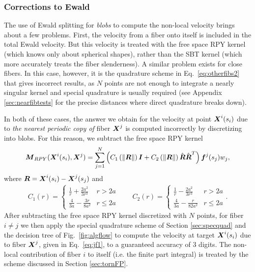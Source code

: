 \subsubsection{Corrections to Ewald}
The use of Ewald splitting for \textit{blobs} to compute the non-local velocity brings about a few problems. First, the velocity from a fiber onto itself is included in the total Ewald velocity. But this velocity is treated with the free space RPY kernel (which knows only about spherical shapes), rather than the SBT kernel (which more accurately treats the fiber slenderness). A similar problem exists for close fibers. In this case, however, it is the quadrature scheme in Eq.\ \eqref{eq:otherfibs2} that gives incorrect results, as $N$ points are not enough to integrate a nearly singular kernel and special quadrature is usually required (see Appendix \ref{sec:nearfibtests} for the precise distances where direct quadrature breaks down).  

In both of these cases, the answer we obtain for the velocity at point $\boldsymbol{X}^i(s_i)$ due to \textit{the nearest periodic copy of} fiber $\boldsymbol{X}^j$ is computed incorrectly by discretizing into blobs. For this reason, we subtract the free space RPY kernel \cite{rpyOG}
\begin{gather}
\label{eq:RPY}
\boldsymbol{M}_{RPY}(\boldsymbol{X}^i(s_i), \boldsymbol{X}^j) = \sum_{j=1}^N \left(C_1\left(\left\Vert \boldsymbol{R}\right\Vert\right)\boldsymbol{I}+C_2\left(\left\Vert \boldsymbol{R}\right\Vert\right)\hat{\boldsymbol{R}}\hat{\boldsymbol{R}}^T\right) \boldsymbol{f}^j(s_j) w_j,
\end{gather}
where $\boldsymbol{R}=\boldsymbol{X}^i(s_i)-\boldsymbol{X}^j(s_j)$ and
\begin{gather}
C_1(r) = \begin{cases} \frac{1}{r}+\frac{2a^2}{3r^3} & r > 2a\\[2 pt] \frac{4}{3a}-\frac{3r}{8a^2} & r \leq 2a\end{cases} \qquad
C_2(r) = \begin{cases} \frac{1}{r}-\frac{2a^2}{3r^3} & r > 2a\\[2 pt] \frac{4}{3a}-\frac{r}{82a^2} & r \leq 2a\end{cases}. 
\end{gather}
After subtracting the free space RPY kernel discretized with $N$ points, for fiber $i \neq j$ we then apply the special quadrature scheme of Section \ref{sec:specquad} and the decision tree of Fig.\ \ref{fig:algflow} to compute the velocity at target $\boldsymbol{X}^i(s_i)$ due to fiber $\boldsymbol{X}^j$, given in Eq.\ \eqref{eq:jf1}, to a guaranteed accuracy of 3 digits. The non-local contribution of fiber $i$ to itself (i.e. the finite part integral) is treated by the scheme discussed in Section \ref{sec:tornFP}. 


